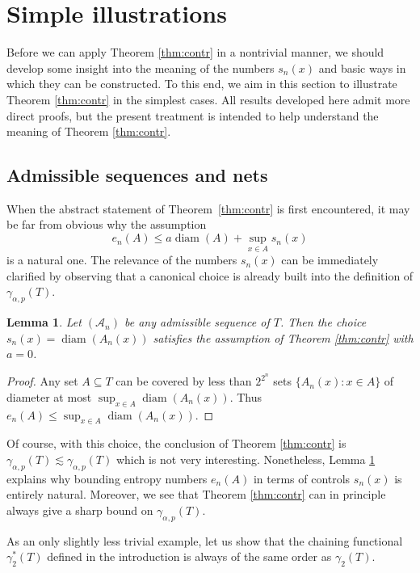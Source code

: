 \documentclass[10pt,reqno]{amsart}
\newtheorem{lem}[thm]{Lemma}
\theoremstyle{definition}
\numberwithin{equation}{section}
\numberwithin{figure}{section}
\numberwithin{table}{section}
\newcommand{\diam}{\mathop{\mathrm{diam}}}
\begin{document}
\section{Simple illustrations}
\label{sec:examples}

Before we can apply Theorem \ref{thm:contr} in a nontrivial manner, we 
should develop some insight into the meaning of the numbers $s_n(x)$ and 
basic ways in which they can be constructed. To this end, we aim in this 
section to illustrate Theorem \ref{thm:contr} in the simplest cases. All 
results developed here admit more direct proofs, but the present treatment 
is intended to help understand the meaning of Theorem \ref{thm:contr}.

\subsection{Admissible sequences and nets}
\label{sec:adnet}

When the abstract statement of Theorem~\ref{thm:contr} is first 
encountered, it may be far from obvious why the assumption
$$
	e_n(A) \le a\diam(A) + \sup_{x\in A}s_n(x)
$$
is a natural one. The relevance of the numbers $s_n(x)$ can be immediately 
clarified by observing that a canonical choice is already built into the 
definition of $\gamma_{\alpha,p}(T)$.

\begin{lem}
\label{lem:triv}
Let $(\mathcal{A}_n)$ be any admissible sequence of $T$. Then the choice
$s_n(x)=\diam(A_n(x))$ satisfies the assumption of Theorem \ref{thm:contr} 
with $a=0$.
\end{lem}

\begin{proof}
Any set $A\subseteq T$ can be covered by less than $2^{2^{n}}$ sets
$\{A_n(x):x\in A\}$ of diameter at most $\sup_{x\in A}\diam(A_n(x))$.
Thus $e_n(A) \le \sup_{x\in A}\diam(A_n(x))$.
\end{proof}

Of course, with this choice, the conclusion of Theorem \ref{thm:contr} is 
$\gamma_{\alpha,p}(T)\lesssim\gamma_{\alpha,p}(T)$ which is not very 
interesting. Nonetheless, Lemma \ref{lem:triv} explains why bounding 
entropy numbers $e_n(A)$ in terms of controls $s_n(x)$ is entirely 
natural. Moreover, we see that Theorem \ref{thm:contr} can in principle 
always give a sharp bound on $\gamma_{\alpha,p}(T)$.

As an only slightly less trivial example, let us show that the chaining 
functional $\gamma_2^*(T)$ defined in the introduction is always of the 
same order as $\gamma_2(T)$.
\end{document}

